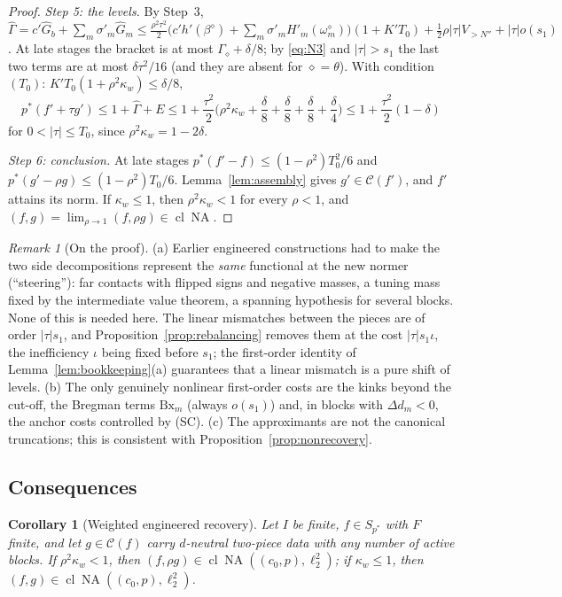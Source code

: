 \documentclass[10pt]{amsart}
\newtheorem{corollary}[theorem]{Corollary}
\theoremstyle{definition}
\theoremstyle{remark}
\newtheorem{remark}[theorem]{Remark}
\newcommand{\NA}{\operatorname{NA}}
\newcommand{\Cset}{\mathcal C}
\newcommand{\cl}{\operatorname{cl}}
\begin{document}
\begin{proof}
\emph{Step 5: the levels.}  By Step~3,
$\hat\Gamma=c'\hat G_b+\sum_m\sigma'_m\hat G_m\le\frac{\rho^2\tau^2}2
\big(c'h'(\beta^\diamond)+\sum_m\sigma'_mH'_m(\omega^\diamond_m)\big)(1+K'T_0)
+\frac12\rho|\tau|V_{>N''}+|\tau|o(s_1)$.  At late stages the bracket is at
most $\Gamma_\diamond+\delta/8$; by \eqref{eq:N3} and $|\tau|>s_1$ the last two
terms are at most $\delta\tau^2/16$ (and they are absent for
$\diamond=\theta$).  With condition $(T_0)$: $K'T_0(1+\rho^2\kappa_w)\le\delta/8$,
\[
 p^*(f'+\tau g')\le1+\hat\Gamma+E\le1+\frac{\tau^2}2\Big(\rho^2\kappa_w+
 \frac\delta8+\frac\delta8+\frac\delta8+\frac\delta4\Big)\le1+\frac{\tau^2}2
 (1-\delta)
\]
for $0<|\tau|\le T_0$, since $\rho^2\kappa_w=1-2\delta$.

\emph{Step 6: conclusion.}  At late stages $p^*(f'-f)\le(1-\rho^2)T_0^2/6$
and $p^*(g'-\rho g)\le(1-\rho^2)T_0/6$.  Lemma~\ref{lem:assembly} gives
$g'\in\Cset(f')$, and $f'$ attains its norm.  If $\kappa_w\le1$, then
$\rho^2\kappa_w<1$ for every $\rho<1$, and $(f,g)=\lim_{\rho\to1}(f,\rho g)
\in\cl\NA$.
\end{proof}

\begin{remark}[On the proof]\label{rem:engineeredproof}
(a) Earlier engineered constructions had to make the two side
decompositions represent the \emph{same} functional at the new normer
\textup{(}``steering''\textup{)}: far contacts with flipped signs and negative
masses, a tuning mass fixed by the intermediate value theorem, a spanning
hypothesis for several blocks.  None of this is needed here.  The linear
mismatches between the pieces are of order $|\tau|s_1$, and
Proposition~\ref{prop:rebalancing} removes them at the cost
$|\tau|s_1\iota$, the inefficiency $\iota$ being fixed before $s_1$; the
first-order identity of Lemma~\ref{lem:bookkeeping}(a) guarantees that a
linear mismatch is a pure shift of levels.
(b) The only genuinely nonlinear first-order costs are the kinks beyond the
cut-off, the Bregman terms $\mathrm{Bx}_m$ (always $o(s_1)$) and, in blocks
with $\Delta d_m<0$, the anchor costs controlled by \textup{(SC)}.
(c) The approximants are not the canonical truncations; this is consistent
with Proposition~\ref{prop:nonrecovery}.
\end{remark}

\subsection{Consequences}

\begin{corollary}[Weighted engineered recovery]\label{cor:weightedengineered}
Let $I$ be finite, $f\in S_{p^*}$ with $F$ finite, and let $g\in\Cset(f)$
carry $d$-neutral two-piece data with any number of active blocks.  If
$\rho^2\kappa_w<1$, then $(f,\rho g)\in\cl\NA((c_0,p),\ell_2^2)$; if
$\kappa_w\le1$, then $(f,g)\in\cl\NA((c_0,p),\ell_2^2)$.
\end{corollary}
\end{document}
